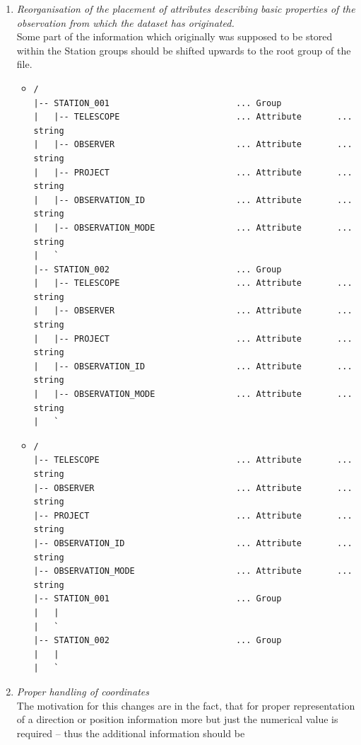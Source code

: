 \documentclass[a4paper,10pt,bibtotoc]{scrartcl}
\begin{document}
\begin{enumerate}
\item \textit{Reorganisation of the placement of attributes describing
    basic properties of the observation from which the dataset has
    originated.} \\
  Some part of the information which originally was supposed to be stored within
  the Station groups should be shifted upwards to the root group of the file.
  \begin{itemize}
  \item[\underline{old}:]
    {\small
\begin{verbatim}
/
|-- STATION_001                         ... Group
|   |-- TELESCOPE                       ... Attribute       ... string
|   |-- OBSERVER                        ... Attribute       ... string
|   |-- PROJECT                         ... Attribute       ... string
|   |-- OBSERVATION_ID                  ... Attribute       ... string
|   |-- OBSERVATION_MODE                ... Attribute       ... string
|   `
|-- STATION_002                         ... Group
|   |-- TELESCOPE                       ... Attribute       ... string
|   |-- OBSERVER                        ... Attribute       ... string
|   |-- PROJECT                         ... Attribute       ... string
|   |-- OBSERVATION_ID                  ... Attribute       ... string
|   |-- OBSERVATION_MODE                ... Attribute       ... string
|   `
\end{verbatim}}
  \item[\underline{new}:]
    {\small
\begin{verbatim}
/
|-- TELESCOPE                           ... Attribute       ... string
|-- OBSERVER                            ... Attribute       ... string
|-- PROJECT                             ... Attribute       ... string
|-- OBSERVATION_ID                      ... Attribute       ... string
|-- OBSERVATION_MODE                    ... Attribute       ... string
|-- STATION_001                         ... Group
|   |
|   `
|-- STATION_002                         ... Group
|   |
|   `
\end{verbatim}}
  \end{itemize}
\item \textit{Proper handling of coordinates} \\
    The motivation for this changes are in the fact, that for proper
    representation of a direction or position information more but just the
    numerical value is required -- thus the additional information should be

\end{enumerate}
\end{document}
